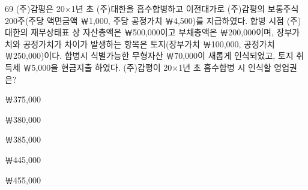 \begin{question}{69}
(주)감평은 20×1년 초 (주)대한을 흡수합병하고 이전대가로 (주)감평의 보통주식 200주(주당 액면금액 ￦1,000, 주당 공정가치 ￦4,500)를 지급하였다. 합병 시점 (주)대한의 재무상태표 상 자산총액은 ￦500,000이고 부채총액은 ￦200,000이며, 장부가치와 공정가치가 차이가 발생하는 항목은 토지(장부가치 ￦100,000, 공정가치 ￦250,000)이다. 합병시 식별가능한 무형자산 ￦70,000이 새롭게 인식되었고, 토지 취득세 ￦5,000을 현금지출 하였다. (주)감평이 20×1년 초 흡수합병 시 인식할 영업권은? \par
\begin{choices}
  \item ￦375,000
  \item ￦380,000
  \item ￦385,000
  \item ￦445,000
  \item ￦455,000
\end{choices}
\end{question}
